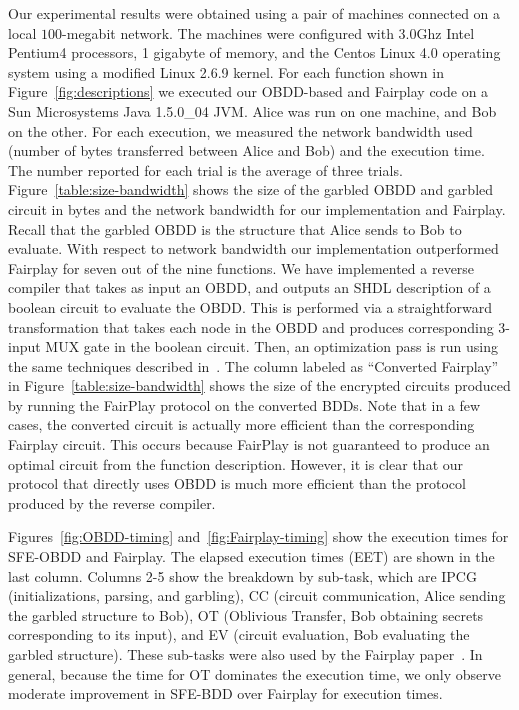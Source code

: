 Our experimental results were obtained using a pair of machines
connected on a local $100$-megabit network.  The machines were
configured with 3.0Ghz Intel Pentium4 processors, 1 gigabyte of
memory, and the Centos Linux 4.0 operating system using a modified
Linux 2.6.9 kernel.  For each function shown in
Figure~\ref{fig:descriptions} we executed our OBDD-based and Fairplay
code on a Sun Microsystems Java 1.5.0\_04 JVM. Alice was run on one
machine, and Bob on the other.  For each execution, we measured the
network bandwidth used (number of bytes transferred between Alice and
Bob) and the execution time. The number reported for each trial is the
average of three trials.  Figure~\ref{table:size-bandwidth} shows the
size of the garbled OBDD and garbled circuit in bytes and the network
bandwidth for our implementation and Fairplay. Recall that the
garbled OBDD is the structure that Alice sends to Bob to
evaluate. With respect to network bandwidth our implementation
outperformed Fairplay for seven out of the nine functions. We have
implemented a reverse compiler that takes as input an OBDD, and
outputs an SHDL description of a boolean circuit to evaluate the OBDD.
This is performed via a straightforward transformation that takes each
node in the OBDD and produces corresponding 3-input MUX gate in the
boolean circuit.  Then, an optimization pass is run using the same
techniques described in~\cite{Fairplay}.  The column labeled as
``Converted Fairplay'' in Figure~\ref{table:size-bandwidth} shows the size
of the encrypted circuits produced by running the FairPlay protocol on
the converted BDDs.  Note that in a few cases, the converted circuit
is actually more efficient than the corresponding Fairplay circuit.  This occurs
because FairPlay is not guaranteed to produce an optimal circuit from
the function description. However, it is clear that our protocol that
directly uses OBDD is much more efficient than the protocol produced
by the reverse compiler.


Figures~\ref{fig:OBDD-timing}
and~\ref{fig:Fairplay-timing} show the execution times for SFE-OBDD and Fairplay.  The elapsed
execution times (EET) are shown in the last column.  Columns 2-5 show
the breakdown by sub-task, which are IPCG (initializations, parsing,
and garbling), CC (circuit communication, Alice sending the garbled
structure to Bob), OT (Oblivious Transfer, Bob obtaining secrets
corresponding to its input),
and EV (circuit evaluation, Bob evaluating the garbled structure). These sub-tasks were also used by the
Fairplay paper~\cite{Fairplay}. In general, because the time for OT dominates
the execution time, we only observe moderate improvement in SFE-BDD over Fairplay
for execution times. 

